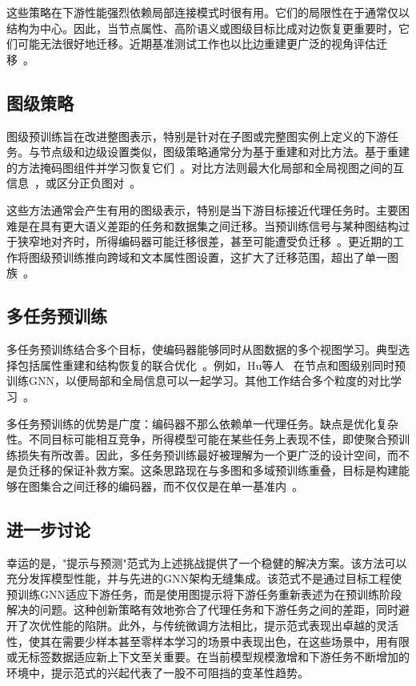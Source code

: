这些策略在下游性能强烈依赖局部连接模式时很有用。它们的局限性在于通常仅以结构为中心。因此，当节点属性、高阶语义或图级目标比成对边恢复更重要时，它们可能无法很好地迁移。近期基准测试工作也以比边重建更广泛的视角评估迁移~\cite{xu2024graphfm}。


\subsection{图级策略}\label{sec:graph_pre}
图级预训练旨在改进整图表示，特别是针对在子图或完整图实例上定义的下游任务。与节点级和边级设置类似，图级策略通常分为基于重建和对比方法。基于重建的方法掩码图组件并学习恢复它们~\cite{xie2022selfsupervised, rong2020selfsupervised}。对比方法则最大化局部和全局视图之间的互信息~\cite{velickovic2019deep, sun2020infograph, hassani2020contrastive, sun2021mocl, subramonian2021motifdriven}，或区分正负图对~\cite{you2020graph, suresh2021adversarial, thakoor2021bootstrapped, qiu2020gcc}。

这些方法通常会产生有用的图级表示，特别是当下游目标接近代理任务时。主要困难是在具有更大语义差距的任务和数据集之间迁移。当预训练信号与某种图结构过于狭窄地对齐时，所得编码器可能迁移很差，甚至可能遭受负迁移~\cite{rosenstein2005transfer}。更近期的工作将图级预训练推向跨域和文本属性图设置，这扩大了迁移范围，超出了单一图族~\cite{he2024unigraph, song2024pure}。


\subsection{多任务预训练}\label{sec:multi_pre}
多任务预训练结合多个目标，使编码器能够同时从图数据的多个视图学习。典型选择包括属性重建和结构恢复的联合优化~\cite{hu2020strategies, hu2020gptgnn, zhang2020graphbert, fang2022geometryenhanced}。例如，Hu等人~\cite{hu2020strategies} 在节点和图级别同时预训练GNN，以便局部和全局信息可以一起学习。其他工作结合多个粒度的对比学习~\cite{jiang2021contrastive, xu2021infogcl}。

多任务预训练的优势是广度：编码器不那么依赖单一代理任务。缺点是优化复杂性。不同目标可能相互竞争，所得模型可能在某些任务上表现不佳，即使聚合预训练损失有所改善。因此，多任务预训练最好被理解为一个更广泛的设计空间，而不是负迁移的保证补救方案。这条思路现在与多图和多域预训练重叠，目标是构建能够在图集合之间迁移的编码器，而不仅仅是在单一基准内~\cite{lachi2024graphfm, yu2025samgpt}。


\subsection{进一步讨论} \label{sec:pre-train-dis}
幸运的是，"提示与预测"范式为上述挑战提供了一个稳健的解决方案。该方法可以充分发挥模型性能，并与先进的GNN架构无缝集成。该范式不是通过目标工程使预训练GNN适应下游任务，而是使用图提示将下游任务重新表述为在预训练阶段解决的问题。这种创新策略有效地弥合了代理任务和下游任务之间的差距，同时避开了次优性能的陷阱。此外，与传统微调方法相比，提示范式表现出卓越的灵活性，使其在需要少样本甚至零样本学习的场景中表现出色，在这些场景中，用有限或无标签数据适应新上下文至关重要。在当前模型规模激增和下游任务不断增加的环境中，提示范式的兴起代表了一股不可阻挡的变革性趋势。


